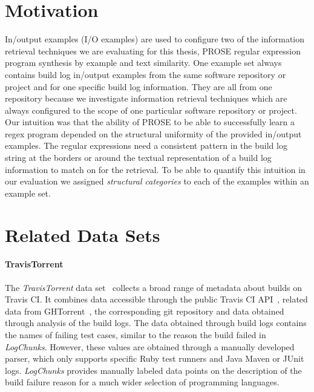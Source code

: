 \documentclass[\myrootdir/main.tex]{subfiles}
\begin{document}
\section{Motivation}
In/output examples (I/O examples) are used to configure two of the information retrieval techniques we are evaluating for this thesis, PROSE regular expression program synthesis by example and text similarity.
One example set always contains build log in/output examples from the same software repository or project and for one specific build log information. They are all from one repository because we investigate information retrieval techniques which are always configured to the scope of one particular software repository or project.
Our intuition was that the ability of PROSE to be able to successfully learn a regex program depended on the structural uniformity of the provided in/output examples.
The regular expressions need a consistent pattern in the build log string at the borders or around the textual representation of a build log information to match on for the retrieval.
To be able to quantify this intuition in our evaluation we assigned \emph{structural categories} to each of the examples within an example set.

\section{Related Data Sets}

\paragraph{TravisTorrent}
The \emph{TravisTorrent} data set~\cite{beller2017travistorrent} collects a broad range of metadata about builds on Travis CI.
It combines data accessible through the public Travis CI API~\cite{travisci2019apidoc}, related data from GHTorrent~\cite{gousios2013ghtorrent}, the corresponding git repository and data obtained through analysis of the build logs.
The data obtained through build logs contains the names of failing test cases, similar to the reason the build failed in \emph{LogChunks}.
However, these values are obtained through a manually developed parser, which only supports specific Ruby test runners and Java Maven or JUnit logs.
\emph{LogChunks} provides manually labeled data points on the description of the build failure reason for a much wider selection of programming languages.
\end{document}
